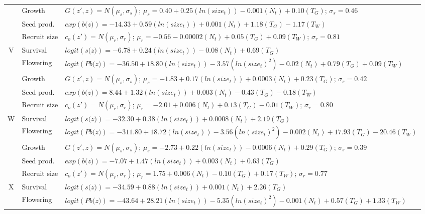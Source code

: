 \documentclass[12pt, letterpaper]{article}
\begin{document}
\begin{spacing}{1.3}
\begin{longtable}[ht!]{c|l|p{}}
         \rowcolor[gray]{.95}& Growth  &  $G(z',z) = N(\mu_s, \sigma_s)$; $\mu_s = 0.40 + 0.25(ln(size_t)) - 0.001 (N_t) + 0.10 (T_G)$; $\sigma_s = 0.46$\\
         & Seed prod.  & $exp(\textit{b(z)}) = -14.33 + 0.59(ln(size_t)) + 0.001 (N_t) + 1.18 (T_G) - 1.17 (T_W)$  \\
         \rowcolor[gray]{.95}& Recruit size  &  $c_o(z') = N(\mu_r, \sigma_r)$; $\mu_r = -0.56 -0.00002 (N_t) + 0.05 (T_G) + 0.09 (T_W) $; $\sigma_r = 0.81$ \\
         \hline
         V  &  Survival  &  $logit(\textit{s(z)})= -6.78 + 0.24(ln(size_t)) -0.08(N_t) + 0.69 (T_G)$ \\
         \rowcolor[gray]{.95}& Flowering  & $logit(\textit{Pb(z)})  = -36.50 + 18.80(ln(size_t)) -3.57(ln(size_t)^2)-0.02 (N_t) + 0.79 (T_G) +0.09 (T_W)$ \\
         & Growth  &  $G(z',z) = N(\mu_s, \sigma_s)$; $\mu_s = -1.83 + 0.17(ln(size_t)) + 0.0003 (N_t) + 0.23 (T_G)$; $\sigma_s = 0.42$\\
         \rowcolor[gray]{.95}& Seed prod.  & $exp(\textit{b(z)}) = 8.44 + 1.32(ln(size_t)) + 0.003 (N_t) -0.43 (T_G) - 0.18 (T_W)$  \\
         & Recruit size  &  $c_o(z') = N(\mu_r, \sigma_r)$; $\mu_r = -2.01 + 0.006 (N_t) + 0.13 (T_G) -0.01 (T_W) $; $\sigma_r = 0.80$ \\
         \hline
         \rowcolor[gray]{.95}W  &  Survival  &  $logit(\textit{s(z)})= -32.30 + 0.38(ln(size_t)) +0.0008(N_t) + 2.19(T_G)$ \\
         & Flowering  & $logit(\textit{Pb(z)})  = -311.80 + 18.72(ln(size_t)) -3.56(ln(size_t)^2)-0.002 (N_t) + 17.93 (T_G) -20.46 (T_W)$ \\
         \rowcolor[gray]{.95}& Growth  &  $G(z',z) = N(\mu_s, \sigma_s)$; $\mu_s = -2.73 + 0.22(ln(size_t)) -0.0006 (N_t) + 0.29 (T_G)$; $\sigma_s = 0.39$\\
         & Seed prod.  & $exp(\textit{b(z)}) = -7.07 + 1.47(ln(size_t)) + 0.003 (N_t) +0.63(T_G)$  \\
         \rowcolor[gray]{.95}& Recruit size  &  $c_o(z') = N(\mu_r, \sigma_r)$; $\mu_r = 1.75 + 0.006 (N_t) - 0.10 (T_G) + 0.17 (T_W) $; $\sigma_r = 0.77$ \\
         \hline
         X  &  Survival  &  $logit(\textit{s(z)})= -34.59 + 0.88(ln(size_t)) +0.001(N_t) + 2.26(T_G)$ \\
         \rowcolor[gray]{.95}& Flowering  & $logit(\textit{Pb(z)})  = -43.64 + 28.21(ln(size_t)) -5.35(ln(size_t)^2)-0.001 (N_t) + 0.57 (T_G) +1.33 (T_W)$ \\

\end{longtable}
\end{spacing}
\end{document}
